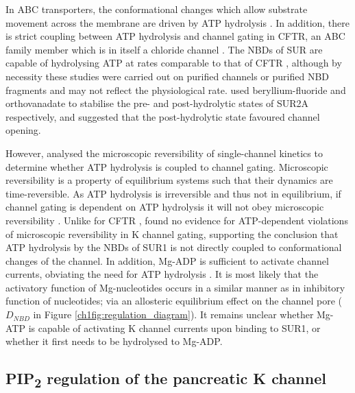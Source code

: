 In ABC transporters, the conformational changes which allow substrate movement across the membrane are driven by ATP hydrolysis \cite{rees_abc_2009}.
In addition, there is strict coupling between ATP hydrolysis and channel gating in CFTR, an ABC family member which is in itself a chloride channel \cite{csanady_strict_2010-1}.
The NBDs of SUR are capable of hydrolysing ATP at rates comparable to that of CFTR \cite{matsuo_atp_1999, wet_studies_2007, puljung_cryo-electron_2018}, although by necessity these studies were carried out on purified channels or purified NBD fragments and may not reflect the physiological rate.
\citeauthor{zingman_signaling_2001-1} used beryllium-fluoride and orthovanadate to stabilise the pre- and post-hydrolytic states of SUR2A respectively, and suggested that the post-hydrolytic state favoured channel opening.

However, \citeauthor{choi_testing_2008} analysed the microscopic reversibility of single-channel kinetics to determine whether ATP hydrolysis is coupled to channel gating.
Microscopic reversibility is a property of equilibrium systems such that their dynamics are time-reversible.
As ATP hydrolysis is irreversible and thus not in equilibrium, if channel gating is dependent on ATP hydrolysis it will not obey microscopic reversibility \cite{rothberg_testing_2001}.
Unlike for CFTR \cite{csanady_strict_2010-1}, \citeauthor{choi_testing_2008} found no evidence for ATP-dependent violations of microscopic reversibility in K\ATP{} channel gating, supporting the conclusion that ATP hydrolysis by the NBDs of SUR1 is not directly coupled to conformational changes of the channel.
In addition, Mg-ADP is sufficient to activate channel currents, obviating the need for ATP hydrolysis \cite{proks_activation_2010-1}.
It is most likely that the activatory function of Mg-nucleotides occurs in a similar manner as in inhibitory function of nucleotides; via an allosteric equilibrium effect on the channel pore ($D_{NBD}$ in Figure \ref{ch1fig:regulation_diagram}).
It remains unclear whether Mg-ATP is capable of activating K\ATP{} channel currents upon binding to SUR1, or whether it first needs to be hydrolysed to Mg-ADP.

\subsection{PIP\textsubscript{2} regulation of the pancreatic K\ATP{} channel}

